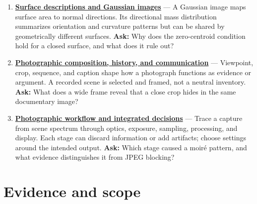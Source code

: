 \begin{enumerate}
  \textbf{\href{Continuous\%20Notes/University\%20-\%20Worlds,\%20Images\%20and\%20Inference\%20-\%20Graphics,\%20Vision\%20and\%20Photography\#Shape\%20from\%20shading\%20and\%20reflectance}{Shape from shading and reflectance}} --- A single shading image gives a nonlinear relation among surface normal, reflectance, and illumination; integration into height requires boundary conditions and extra assumptions. \textbf{Ask:} Why does a locally valid normal field fail to guarantee one globally consistent surface?
\item
  \textbf{\href{Continuous\%20Notes/University\%20-\%20Worlds,\%20Images\%20and\%20Inference\%20-\%20Graphics,\%20Vision\%20and\%20Photography\#Surface\%20descriptions\%20and\%20Gaussian\%20images}{Surface descriptions and Gaussian images}} --- A Gaussian image maps surface area to normal directions. Its directional mass distribution summarizes orientation and curvature patterns but can be shared by geometrically different surfaces. \textbf{Ask:} Why does the zero-centroid condition hold for a closed surface, and what does it rule out?
\item
  \textbf{\href{Continuous\%20Notes/University\%20-\%20Worlds,\%20Images\%20and\%20Inference\%20-\%20Graphics,\%20Vision\%20and\%20Photography\#Photographic\%20composition,\%20history,\%20and\%20communication}{Photographic composition, history, and communication}} --- Viewpoint, crop, sequence, and caption shape how a photograph functions as evidence or argument. A recorded scene is selected and framed, not a neutral inventory. \textbf{Ask:} What does a wide frame reveal that a close crop hides in the same documentary image?
\item
  \textbf{\href{Continuous\%20Notes/University\%20-\%20Worlds,\%20Images\%20and\%20Inference\%20-\%20Graphics,\%20Vision\%20and\%20Photography\#Photographic\%20workflow\%20and\%20integrated\%20decisions}{Photographic workflow and integrated decisions}} --- Trace a capture from scene spectrum through optics, exposure, sampling, processing, and display. Each stage can discard information or add artifacts; choose settings around the intended output. \textbf{Ask:} Which stage caused a moiré pattern, and what evidence distinguishes it from JPEG blocking?
\end{enumerate}

\section{Evidence and scope}\label{appendix-a8f634b076b5-evidence-and-scope}

